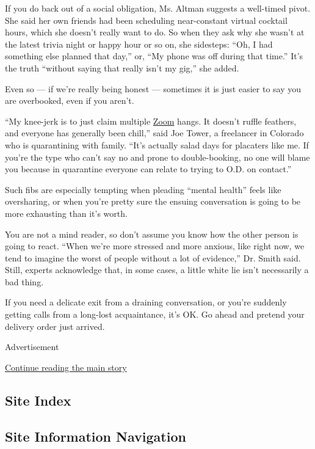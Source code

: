 If you do back out of a social obligation, Ms. Altman suggests a
well-timed pivot. She said her own friends had been scheduling
near-constant virtual cocktail hours, which she doesn't really want to
do. So when they ask why she wasn't at the latest trivia night or happy
hour or so on, she sidesteps: ``Oh, I had something else planned that
day,'' or, ``My phone was off during that time.'' It's the truth
``without saying that really isn't my gig,'' she added.

Even so --- if we're really being honest --- sometimes it is just easier
to say you are overbooked, even if you aren't.

``My knee-jerk is to just claim multiple
\href{https://www.nytimes3xbfgragh.onion/2020/06/11/technology/zoom-china-tiananmen-square.html}{Zoom}
hangs. It doesn't ruffle feathers, and everyone has generally been
chill,'' said Joe Tower, a freelancer in Colorado who is quarantining
with family. ``It's actually salad days for placaters like me. If you're
the type who can't say no and prone to double-booking, no one will blame
you because in quarantine everyone can relate to trying to O.D. on
contact.''

Such fibs are especially tempting when pleading ``mental health'' feels
like oversharing, or when you're pretty sure the ensuing conversation is
going to be more exhausting than it's worth.

You are not a mind reader, so don't assume you know how the other person
is going to react. ``When we're more stressed and more anxious, like
right now, we tend to imagine the worst of people without a lot of
evidence,'' Dr. Smith said. Still, experts acknowledge that, in some
cases, a little white lie isn't necessarily a bad thing.

If you need a delicate exit from a draining conversation, or you're
suddenly getting calls from a long-lost acquaintance, it's OK. Go ahead
and pretend your delivery order just arrived.

Advertisement

\protect\hyperlink{after-bottom}{Continue reading the main story}

\hypertarget{site-index}{%
\subsection{Site Index}\label{site-index}}

\hypertarget{site-information-navigation}{%
\subsection{Site Information
Navigation}\label{site-information-navigation}}

